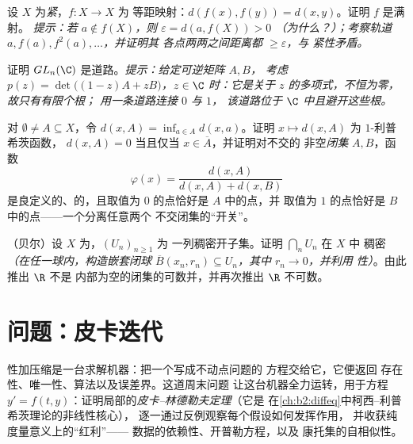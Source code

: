 \begin{exercise}[$\star\star\star$]\label{exo:b2:metric:9}
设 $X$ 为\emph{紧}，$f \colon X \to X$ 为
等距映射：$d(f(x), f(y)) = d(x, y)$。证明 $f$ 是满射。
\emph{提示：若 $a \notin f(X)$，则 $\varepsilon = d(a, f(X)) > 0$
（为什么？）；考察轨道 $a, f(a), f^2(a), \dots$，并证明其
各点两两之间距离都 $\geq \varepsilon$，与
紧性矛盾。}
\end{exercise}

\begin{exercise}[$\star\star\star$]\label{exo:b2:metric:10}
证明 $GL_n(\C)$ 是道路。\emph{提示：给定可逆矩阵 $A, B$，
考虑 $p(z) = \det\bigl((1 - z)A + zB\bigr)$，$z
\in \C$ 时：它是关于 $z$ 的多项式，不恒为零，故只有有限个根；
用一条道路连接 $0$ 与 $1$，
该道路位于 $\C$ 中且避开这些根。}
\end{exercise}

\begin{exercise}[$\star\star$]\label{exo:b2:metric:11}
对 $\emptyset \neq A \subseteq X$，令 $d(x, A) = \inf_{a \in A}
d(x, a)$。证明 $x \mapsto d(x, A)$ 为 $1$-利普希茨函数，
$d(x, A) = 0$ 当且仅当 $x \in \overline A$，并证明对不交的
非空\emph{闭集} $A, B$，函数
\[
\varphi(x) = \frac{d(x, A)}{d(x, A) + d(x, B)}
\]
是良定义的、的，且取值为 $0$ 的点恰好是 $A$ 中的点，并
取值为 $1$ 的点恰好是 $B$ 中的点——一个分离任意两个
不交闭集的“开关”。
\end{exercise}

\begin{exercise}[$\star\star\star$]\label{exo:b2:metric:12}
（贝尔）设 $X$ 为，$(U_n)_{n\geq1}$ 为
一列稠密开子集。证明 $\bigcap_n U_n$ 在 $X$ 中
稠密\emph{（在任一球内，构造嵌套闭球
$\overline B(x_n, r_n) \subseteq U_n$，其中 $r_n \to 0$，并利用
性）}。由此推出 $\R$ 不是
内部为空的闭集的可数并，并再次推出
$\R$ 不可数。
\end{exercise}

\section{问题：皮卡迭代}

性加压缩是一台求解机器：把一个写成不动点问题的
方程交给它，它便返回
存在性、唯一性、算法以及误差界。这道周末问题
让这台机器全力运转，用于方程 $y' = f(t,
y)$：证明局部的\emph{皮卡--林德勒夫定理}（它是
在\cref{ch:b2:diffeq}中柯西--利普希茨理论的非线性核心），
逐一通过反例观察每个假设如何发挥作用，
并收获纯度量意义上的“红利”——
数据的依赖性、开普勒方程，以及
康托集的自相似性。

